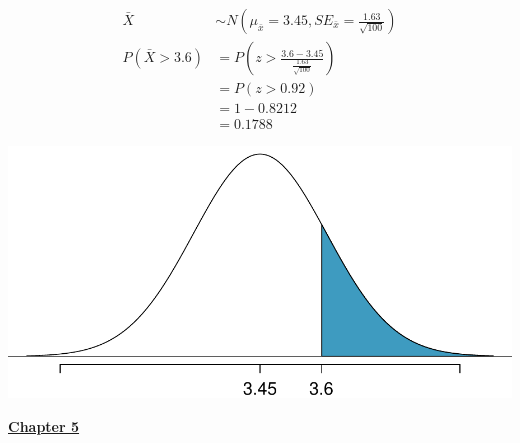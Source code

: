 \documentclass[11pt]{article}
\begin{document}
\begin{enumerate}
\begin{enumerate}[(a)]
\begin{minipage}[c]{0.5\textwidth}
\begin{align*}
\bar{X} &\sim N\left(\mu_{\bar{x}} = 3.45, SE_{\bar{x}} = \frac{1.63}{\sqrt{100}}\right) \\
P(\bar{X} > 3.6 ) &= P\left(z > \frac{3.6 - 3.45}{\frac{1.63}{\sqrt{100}}}\right) \\
&= P(z > 0.92) \\
&= 1 - 0.8212 \\
&=  0.1788
\end{align*}
\end{minipage}
\begin{minipage}[c]{0.5\textwidth}
\begin{center}
\includegraphics[width=\textwidth]{figures/ipod_n100.pdf}
\end{center}
\end{minipage}
\end{enumerate}
\end{enumerate}
%

\pagebreak

{\large \textbf{\underline{Chapter 5}}}
\end{document}
